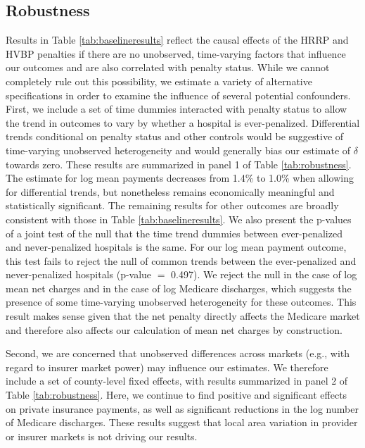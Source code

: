 \documentclass[12pt]{article}
\begin{document}
\subsection{Robustness}
\label{sec:robust}
Results in Table \ref{tab:baselineresults} reflect the causal effects of the HRRP and HVBP penalties if there are no unobserved, time-varying factors that influence our outcomes and are also correlated with penalty status.  While we cannot completely rule out this possibility, we estimate a variety of alternative specifications in order to examine the influence of several potential confounders.  First, we include a set of time dummies interacted with penalty status to allow the trend in outcomes to vary by whether a hospital is ever-penalized. Differential trends conditional on penalty status and other controls would be suggestive of time-varying unobserved heterogeneity and would generally bias our estimate of $\delta$ towards zero.  These results are summarized in panel 1 of Table \ref{tab:robustness}. The estimate for log mean payments decreases from 1.4\% to 1.0\% when allowing for differential trends, but nonetheless remains economically meaningful and statistically significant. The remaining results for other outcomes are broadly consistent with those in Table \ref{tab:baselineresults}. We also present the p-values of a joint test of the null that the time trend dummies between ever-penalized and never-penalized hospitals is the same. For our log mean payment outcome, this test fails to reject the null of common trends between the ever-penalized and never-penalized hospitals (p-value $=$ 0.497). We reject the null in the case of log mean net charges and in the case of log Medicare discharges, which suggests the presence of some time-varying unobserved heterogeneity for these outcomes. This result makes sense given that the net penalty directly affects the Medicare market and therefore also affects our calculation of mean net charges by construction.

Second, we are concerned that unobserved differences across markets (e.g., with regard to insurer market power) may influence our estimates. We therefore include a set of county-level fixed effects, with results summarized in panel 2 of Table \ref{tab:robustness}. Here, we continue to find positive and significant effects on private insurance payments, as well as significant reductions in the log number of Medicare discharges. These results suggest that local area variation in provider or insurer markets is not driving our results.
\end{document}
